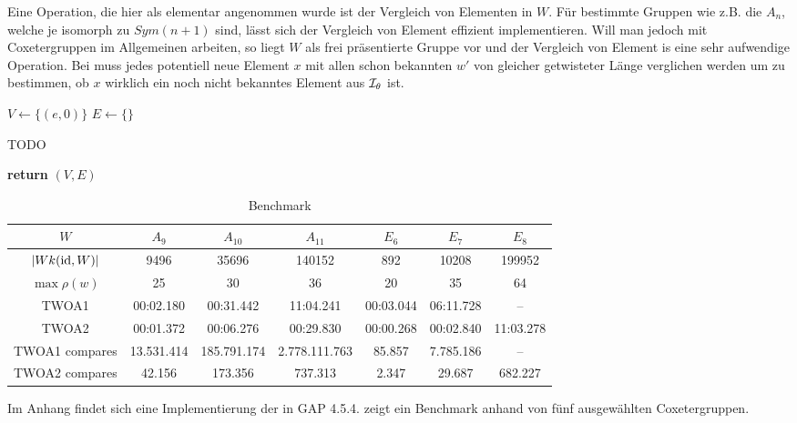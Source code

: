 Eine Operation, die hier als elementar angenommen wurde ist der Vergleich von
Elementen in $W$. Für bestimmte Gruppen wie z.B. die $A_n$, welche je isomorph
zu $Sym(n+1)$ sind, lässt sich der Vergleich von Element effizient
implementieren. Will man jedoch mit Coxetergruppen im Allgemeinen arbeiten, so
liegt $W$ als frei präsentierte Gruppe vor und der Vergleich von Element is eine
sehr aufwendige Operation. Bei  muss jedes
potentiell neue Element $x$ mit allen schon bekannten $w'$ von gleicher
getwisteter Länge verglichen werden um zu bestimmen, ob $x$ wirklich ein noch
nicht bekanntes Element aus $\mathcal{I}_{\theta}$ ist.

\begin{algo}[Algorithmus 2]
\hfill
\label{twoa2}
\begin{algorithmic}[1]
 
\State $V \gets \{(e,0)\}$
\State $E \gets \{\}$

	\State TODO
\EndFor

\State \textbf{return} $(V,E)$
\EndProcedure
\end{algorithmic}
\end{algo}

\begin{table}
\label{benchmark-twoa}
\centering
\begin{tabular}{|c|c|c|c|c|c|c|}
\hline
$W$ & $A_9$ & $A_{10}$ & $A_{11}$ & $E_6$ & $E_7$ & $E_8$
\\
\hline
$|Wk(\operatorname{id},W)|$ & 9496 & 35696 & 140152 & 892 & 10208 & 199952 \\
\hline
$\max \rho(w)$ & 25 & 30 & 36 & 20 & 35 & 64 \\
\hline
TWOA1 & 00:02.180 & 00:31.442 & 11:04.241 & 00:03.044 & 06:11.728 & -- \\
\hline
TWOA2 & 00:01.372 & 00:06.276 & 00:29.830 & 00:00.268 & 00:02.840 & 11:03.278 \\
\hline
TWOA1 compares & 13.531.414 & 185.791.174 & 2.778.111.763 & 85.857 &
7.785.186 & --
\\
\hline
TWOA2 compares & 42.156 & 173.356 & 737.313 & 2.347 & 29.687 & 682.227 \\
\hline
\end{tabular}
\caption{Benchmark}
\end{table}

Im Anhang findet sich eine Implementierung der 
in GAP 4.5.4.  zeigt ein Benchmark anhand von fünf
ausgewählten Coxetergruppen.

